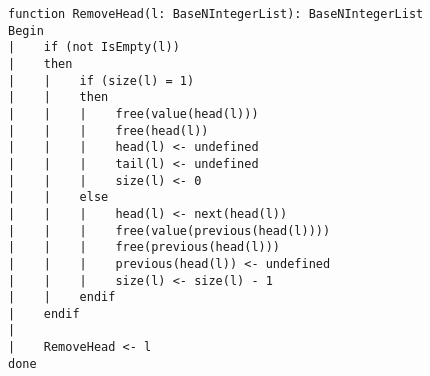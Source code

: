 \begin{lstlisting}[breaklines]
function RemoveHead(l: BaseNIntegerList): BaseNIntegerList
Begin
|    if (not IsEmpty(l))
|    then
|    |    if (size(l) = 1)
|    |    then
|    |    |    free(value(head(l)))
|    |    |    free(head(l))
|    |    |    head(l) <- undefined
|    |    |    tail(l) <- undefined
|    |    |    size(l) <- 0
|    |    else
|    |    |    head(l) <- next(head(l))
|    |    |    free(value(previous(head(l))))
|    |    |    free(previous(head(l)))
|    |    |    previous(head(l)) <- undefined
|    |    |    size(l) <- size(l) - 1
|    |    endif
|    endif
|
|    RemoveHead <- l
done
\end{lstlisting}
